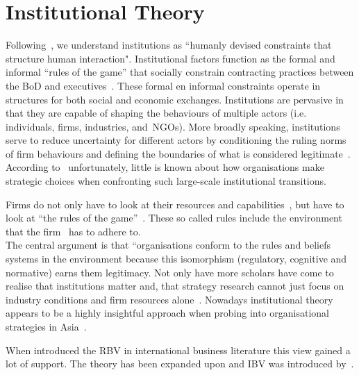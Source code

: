 \section{Institutional Theory}\label{sec:InTh}


Following~\cite{North:1990}, we understand institutions as ``humanly devised constraints that structure human interaction". 
Institutional factors function as the formal and informal ``rules of the game'' that socially constrain contracting practices between the \gls{BoD} and executives~\cite{North:1990}.
These formal en informal constraints operate in structures for both social and economic exchanges. 
Institutions are pervasive in that they are capable of shaping the behaviours of multiple actors (i.e. 
individuals, firms, industries, and~\glspl{NGO}). 
More broadly speaking, institutions serve to reduce uncertainty for different actors by conditioning the ruling norms of firm behaviours and defining the boundaries of what is considered legitimate~\cite{Peng:2008}.\\


According to~\cite{Peng:2003} unfortunately, little is known about how organisations make strategic choices when confronting such large-scale institutional transitions.


 Firms do not only have to look at their resources and capabilities~\cite{Barney:1991}, but have to look at ``the rules of the game''~\cite{Scott:1995}. These so called rules include the environment that the firm \mne~has to adhere to.\\

The central argument is that “organisations conform to the rules and beliefs systems in the environment because this isomorphism (regulatory, cognitive and normative) earns them legitimacy.
Not only have more scholars have come to realise that institutions matter and, that strategy research cannot just focus on industry conditions and firm resources alone~\cite{Powell:1991,Scott:1995}.
Nowadays institutional theory appears to be a highly insightful approach when probing into organisational strategies in Asia~\cite{Hoskisson:2000}.

When introduced the \gls{RBV} in international business literature this view gained a lot of support. 
The theory has been expanded upon and \gls{IBV} was introduced by~\cite{Kostova:1999,Meyer:2009,Wang:2012}.




